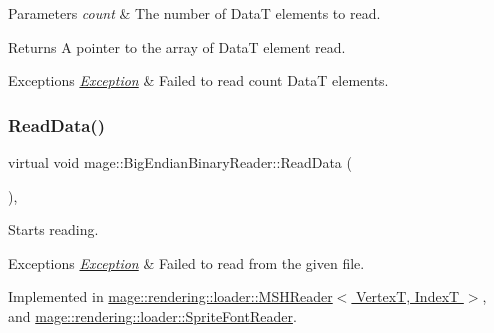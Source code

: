 \begin{DoxyParams}{Parameters}
{\em count} & The number of {\ttfamily DataT} elements to read. \\
\hline
\end{DoxyParams}
\begin{DoxyReturn}{Returns}
A pointer to the array of {\ttfamily DataT} element read. 
\end{DoxyReturn}

\begin{DoxyExceptions}{Exceptions}
{\em \hyperlink{classmage_1_1_exception}{Exception}} & Failed to read {\ttfamily count} {\ttfamily DataT} elements. \\
\hline
\end{DoxyExceptions}
\hypertarget{classmage_1_1_big_endian_binary_reader_a7dc0689d598fa91308597b129516a11d}{}\label{classmage_1_1_big_endian_binary_reader_a7dc0689d598fa91308597b129516a11d} 
\subsubsection{\texorpdfstring{Read\+Data()}{ReadData()}}
{\footnotesize\ttfamily virtual void mage\+::\+Big\+Endian\+Binary\+Reader\+::\+Read\+Data (\begin{DoxyParamCaption}{ }\end{DoxyParamCaption})\hspace{0.3cm}{\ttfamily [private]}, {}}

Starts reading.


\begin{DoxyExceptions}{Exceptions}
{\em \hyperlink{classmage_1_1_exception}{Exception}} & Failed to read from the given file. \\
\hline
\end{DoxyExceptions}


Implemented in \hyperlink{classmage_1_1rendering_1_1loader_1_1_m_s_h_reader_a99e8e3c50decb9332dc10bcdf7b6e00a}{mage\+::rendering\+::loader\+::\+M\+S\+H\+Reader$<$ Vertex\+T, Index\+T $>$}, and \hyperlink{classmage_1_1rendering_1_1loader_1_1_sprite_font_reader_ae5b827dade3bd800e2000788efa91e30}{mage\+::rendering\+::loader\+::\+Sprite\+Font\+Reader}.

\hypertarget{classmage_1_1_big_endian_binary_reader_a68db676feaa42c1c3a9bf16d0680b04f}{}\label{classmage_1_1_big_endian_binary_reader_a68db676feaa42c1c3a9bf16d0680b04f} 
